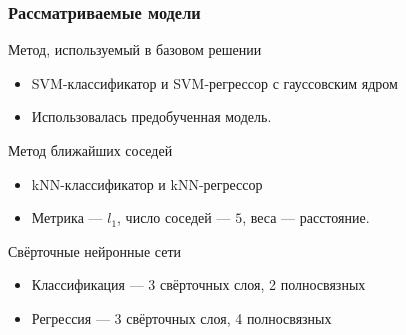 \documentclass{beamer}
\begin{document}




\begin{frame}
\frametitle{Рассматриваемые модели}
\begin{block}{Метод, используемый в базовом решении}
    \begin{itemize}
        \item SVM-классификатор и SVM-регрессор с гауссовским ядром
        \item Использовалась предобученная модель.
    \end{itemize}
\end{block}

\begin{block}{Метод ближайших соседей}
    \begin{itemize}
        \item kNN-классификатор и kNN-регрессор
        \item Метрика --- $l_1$, число соседей --- $5$, веса --- расстояние.
    \end{itemize}
\end{block}
\begin{block}{Свёрточные нейронные сети}
    \begin{itemize}
        \item Классификация --- 3 свёрточных слоя, 2 полносвязных
        \item Регрессия --- 3 свёрточных слоя, 4 полносвязных
    \end{itemize}
\end{block}
\end{frame}
\end{document}
